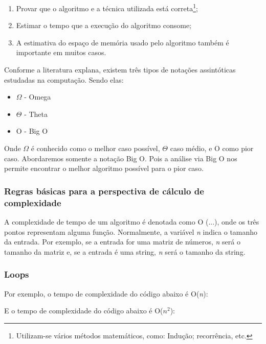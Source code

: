     \begin{enumerate}
        \item Provar que o algoritmo e a técnica utilizada está correta\footnote{Utilizam-se vários métodos matemáticos, como: Indução; recorrência, etc. };
        \item Estimar o tempo que a execução do algoritmo consome;
        \item A estimativa do espaço de memória usado pelo algoritmo também é importante em muitos casos.
    \end{enumerate}

Conforme a literatura explana, existem três tipos de notações assintóticas estudadas na computação. Sendo elas:

    \begin{itemize}
        \item $\Omega$ - Omega
        \item $\Theta$ - Theta
        \item O - Big O
    \end{itemize}
    
Onde $\Omega$ é conhecido como o melhor caso possível, $\Theta$ caso médio, e O como pior caso. Abordaremos somente a notação Big O. Pois a análise via Big O nos permite encontrar o melhor algoritmo possível para o pior caso.
    
\subsubsection{Regras básicas para a perspectiva de cálculo de complexidade}

A complexidade de tempo de um algoritmo é denotada como O (...), onde os três pontos representam alguma função. Normalmente, a variável \textit{n} indica o tamanho da entrada. Por exemplo, se a entrada for uma matriz de números, \textit{n} será o tamanho da matriz e, se a entrada é uma string, \textit{n} será o tamanho da string.


\subsubsection*{Loops}

Por exemplo, o tempo de complexidade do código abaixo é O(\textit{n}):



E o tempo de complexidade do código abaixo é O($n^2$):

